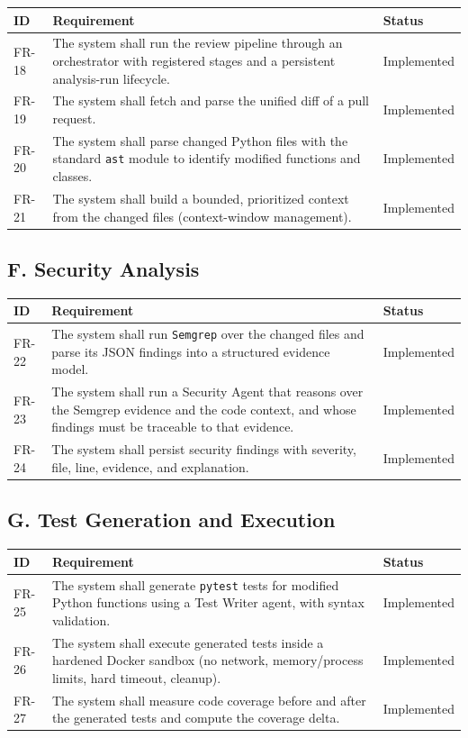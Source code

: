 \begin{longtable}{@{}p{1.4cm}p{11.6cm}p{2.0cm}@{}}
\toprule
\textbf{ID} & \textbf{Requirement} & \textbf{Status} \\
\midrule
\endhead
FR-18 & The system shall run the review pipeline through an orchestrator with
registered stages and a persistent analysis-run lifecycle. & Implemented \\
FR-19 & The system shall fetch and parse the unified diff of a pull request. & Implemented \\
FR-20 & The system shall parse changed Python files with the standard \texttt{ast}
module to identify modified functions and classes. & Implemented \\
FR-21 & The system shall build a bounded, prioritized context from the changed
files (context-window management). & Implemented \\
\bottomrule
\end{longtable}

\subsection{F. Security Analysis}

\begin{longtable}{@{}p{1.4cm}p{11.6cm}p{2.0cm}@{}}
\toprule
\textbf{ID} & \textbf{Requirement} & \textbf{Status} \\
\midrule
\endhead
FR-22 & The system shall run \texttt{Semgrep} over the changed files and parse
its JSON findings into a structured evidence model. & Implemented \\
FR-23 & The system shall run a Security Agent that reasons over the Semgrep
evidence and the code context, and whose findings must be traceable to that
evidence. & Implemented \\
FR-24 & The system shall persist security findings with severity, file, line,
evidence, and explanation. & Implemented \\
\bottomrule
\end{longtable}

\subsection{G. Test Generation and Execution}

\begin{longtable}{@{}p{1.4cm}p{11.6cm}p{2.0cm}@{}}
\toprule
\textbf{ID} & \textbf{Requirement} & \textbf{Status} \\
\midrule
\endhead
FR-25 & The system shall generate \texttt{pytest} tests for modified Python
functions using a Test Writer agent, with syntax validation. & Implemented \\
FR-26 & The system shall execute generated tests inside a hardened Docker
sandbox (no network, memory/process limits, hard timeout, cleanup). & Implemented \\
FR-27 & The system shall measure code coverage before and after the generated
tests and compute the coverage delta. & Implemented \\
\bottomrule
\end{longtable}

